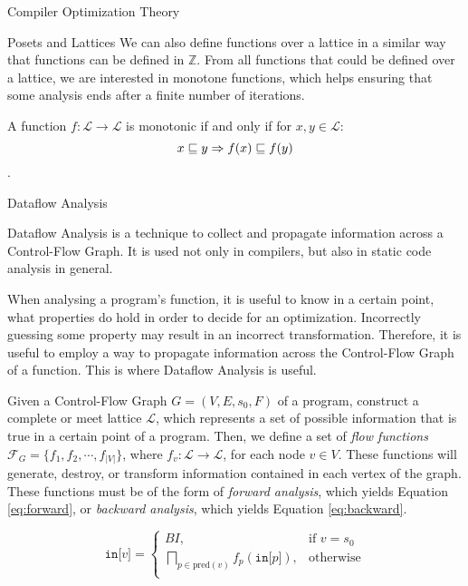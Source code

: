 \begin{section}{Compiler Optimization Theory}
\begin{subsection}{Posets and Lattices}
We can also define functions over a lattice in a similar way that functions can
be defined in $\mathbb{Z}$. From all functions that could be defined over a
lattice, we are interested in monotone functions, which helps ensuring that
some analysis ends after a finite number of iterations.

\begin{definition}
	A function $f:\mathcal{L} \longrightarrow \mathcal{L}$ is monotonic if and only if
	for $x, y \in \mathcal{L}$:
	$$x \sqsubseteq y \Rightarrow f(x) \sqsubseteq f(y)$$.
\end{definition}

\end{subsection}

\begin{subsection}{Dataflow Analysis}

	Dataflow Analysis is a technique to collect and propagate information across a
	Control-Flow Graph. It is used not only in compilers, but also in static
	code analysis in general.

	When analysing a program's function, it is useful to know in a certain point,
	what properties do hold in order to decide for an optimization. Incorrectly
	guessing some property may result in an incorrect transformation. Therefore,
	it is useful to employ a way to propagate information across the Control-Flow
	Graph of a function. This is where Dataflow Analysis is useful.

	Given a Control-Flow Graph $G = (V, E, s_0, F)$ of a program, construct
	a complete or meet lattice $\mathcal{L}$, which represents a set of
	possible information that is true in a certain point of a program.
	Then, we define a set of \textit{flow functions}
	$\mathcal{F}_G = \{f_1, f_2, \cdots, f_{|V|}\}$, where $f_v: \mathcal{L} \longrightarrow \mathcal{L}$,
	for each node $v \in V$. These functions will generate, destroy, or transform information contained in each vertex of the graph. These functions must be of the form of \textit{forward
	analysis}, which yields Equation \ref{eq:forward}, or \textit{backward analysis},
	which yields Equation \ref{eq:backward}.

\begin{equation}\label{eq:forward}
	\texttt{in[} v \texttt{]} = \begin{cases}
	  BI,& \text{if } v = s_0 \\
	  \bigsqcap_{p \in \text{pred}(v)}f_p(\texttt{in[}p\texttt{]}) ,& \text{otherwise} \\
	\end{cases}
\end{equation}


\end{subsection}
\end{section}
